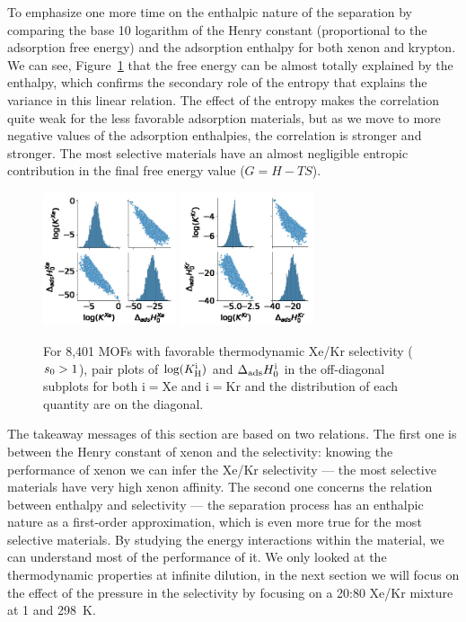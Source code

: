 \documentclass[main.tex]{subfiles}
\begin{document}
To emphasize one more time on the enthalpic nature of the separation by comparing the base 10 logarithm of the Henry constant (proportional to the adsorption free energy) and the adsorption enthalpy for both xenon and krypton. We can see, Figure~\ref{fgr:SI:HK} that the free energy can be almost totally explained by the enthalpy, which confirms the secondary role of the entropy that explains the variance in this linear relation. The effect of the entropy makes the correlation quite weak for the less favorable adsorption materials, but as we move to more negative values of the adsorption enthalpies, the correlation is stronger and stronger. The most selective materials have an almost negligible entropic contribution in the final free energy value ($G=H-TS$).

\begin{figure}[h]
  \centering
    \includegraphics[width=0.35\textwidth]{figures/2-thermo/H_K_Xe.jpg}
    \includegraphics[width=0.35\textwidth]{figures/2-thermo/H_K_Kr.jpg}
    \caption{For 8,401 MOFs with favorable thermodynamic Xe/Kr selectivity ($s_{\text{0}} > 1$), pair plots of $\log(K_{\text{H}}^{\text{i}})$ and $\Delta_{\text{ads}}H^{\text{i}}_{\text{0}}$ in the off-diagonal subplots for both i$=$Xe and i$=$Kr and the distribution of each quantity are on the diagonal.}
    \label{fgr:SI:HK}
\end{figure}

The takeaway messages of this section are based on two relations. The first one is between the Henry constant of xenon and the selectivity: knowing the performance of xenon we can infer the Xe/Kr selectivity --- the most selective materials have very high xenon affinity. The second one concerns the relation between enthalpy and selectivity --- the separation process has an enthalpic nature as a first-order approximation, which is even more true for the most selective materials. By studying the energy interactions within the material, we can understand most of the performance of it. We only looked at the thermodynamic properties at infinite dilution, in the next section we will focus on the effect of the pressure in the selectivity by focusing on a 20:80 Xe/Kr mixture at \SI{1}{\atm} and \SI{298}{\kelvin}. 
\end{document}
